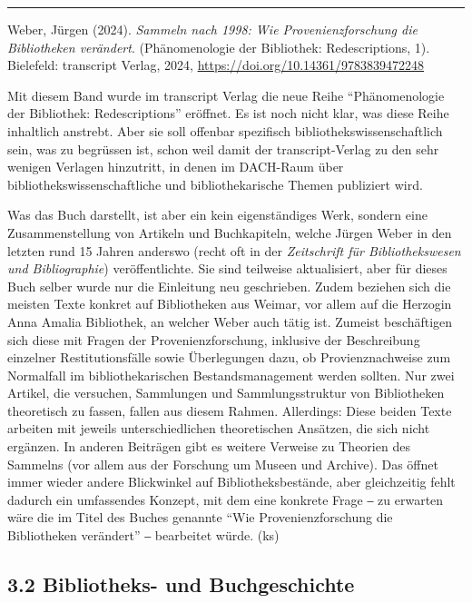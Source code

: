 \documentclass[a4paper,
fontsize=11pt,
oneside,
numbers=noperiodatend,
parskip=half-,
bibliography=totoc,
final
]{scrartcl}
\begin{document}
\begin{center}\rule{0.5\linewidth}{0.5pt}\end{center}

Weber, Jürgen (2024). \emph{Sammeln nach 1998: Wie Provenienzforschung
die Bibliotheken verändert}. (Phänomenologie der Bibliothek:
Redescriptions, 1). Bielefeld: transcript Verlag, 2024,
\url{https://doi.org/10.14361/9783839472248}

Mit diesem Band wurde im transcript Verlag die neue Reihe
\enquote{Phänomenologie der Bibliothek: Redescriptions} eröffnet. Es ist
noch nicht klar, was diese Reihe inhaltlich anstrebt. Aber sie soll
offenbar spezifisch bibliothekswissenschaftlich sein, was zu begrüssen
ist, schon weil damit der transcript-Verlag zu den sehr wenigen Verlagen
hinzutritt, in denen im DACH-Raum über bibliothekswissenschaftliche und
bibliothekarische Themen publiziert wird.

Was das Buch darstellt, ist aber ein kein eigenständiges Werk, sondern
eine Zusammenstellung von Artikeln und Buchkapiteln, welche Jürgen Weber
in den letzten rund 15 Jahren anderswo (recht oft in der
\emph{Zeitschrift für Bibliothekswesen und Bibliographie})
veröffentlichte. Sie sind teilweise aktualisiert, aber für dieses Buch
selber wurde nur die Einleitung neu geschrieben. Zudem beziehen sich die
meisten Texte konkret auf Bibliotheken aus Weimar, vor allem auf die
Herzogin Anna Amalia Bibliothek, an welcher Weber auch tätig ist.
Zumeist beschäftigen sich diese mit Fragen der Provenienzforschung,
inklusive der Beschreibung einzelner Restitutionsfälle sowie
Überlegungen dazu, ob Provienznachweise zum Normalfall im
bibliothekarischen Bestandsmanagement werden sollten. Nur zwei Artikel,
die versuchen, Sammlungen und Sammlungsstruktur von Bibliotheken
theoretisch zu fassen, fallen aus diesem Rahmen. Allerdings: Diese
beiden Texte arbeiten mit jeweils unterschiedlichen theoretischen
Ansätzen, die sich nicht ergänzen. In anderen Beiträgen gibt es weitere
Verweise zu Theorien des Sammelns (vor allem aus der Forschung um Museen
und Archive). Das öffnet immer wieder andere Blickwinkel auf
Bibliotheksbestände, aber gleichzeitig fehlt dadurch ein umfassendes
Konzept, mit dem eine konkrete Frage ‒ zu erwarten wäre die im Titel des
Buches genannte \enquote{Wie Provenienzforschung die Bibliotheken
verändert} ‒ bearbeitet würde. (ks)

\hypertarget{bibliotheks--und-buchgeschichte}{%
\subsection{3.2 Bibliotheks- und
Buchgeschichte}\label{bibliotheks--und-buchgeschichte}}
\end{document}
